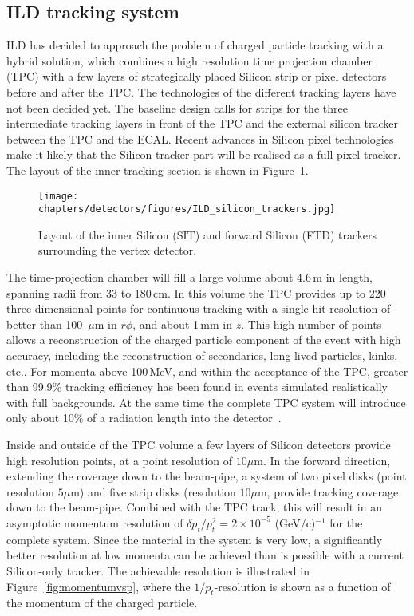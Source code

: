 \subsection{ILD tracking system}

 ILD has decided to approach the problem of charged particle tracking with a hybrid solution, which combines a high resolution time projection chamber (TPC) with a few layers of strategically placed Silicon strip or pixel detectors before and after the TPC. The technologies of the different tracking layers have not been decided yet. The baseline design calls for strips for the three intermediate tracking layers in front of the TPC and the external silicon tracker between the TPC and the ECAL. Recent advances in Silicon pixel technologies make it likely that the Silicon tracker part will be realised as a full pixel tracker. The layout of the inner tracking section is shown in Figure~\ref{fig:det:silicon}.
 \begin{figure}[t!]
\centering
\texttt{[image: chapters/detectors/figures/ILD\_silicon\_trackers.jpg]}
\caption{Layout of the inner Silicon (SIT) and forward Silicon (FTD) trackers surrounding the vertex detector.}
\label{fig:det:silicon}
\end{figure}

The time-projection chamber will fill a large volume about 4.6\,m in length, spanning radii from 33 to 180\,cm. In this volume the TPC provides up to 220 three dimensional points for continuous tracking with a single-hit resolution of better than 100~$\mu\mathrm{m}$ in $r \phi$, and about 1\,mm in $z$. This high number of points allows a reconstruction of the charged particle component of the event with high accuracy, including the reconstruction of secondaries, long lived particles, kinks, etc.. For momenta above 100\,MeV, and within the acceptance of the TPC, greater than 99.9\% tracking efficiency has been found in events simulated realistically with full backgrounds. At the same time the complete TPC system will introduce only about 10\% of a radiation length into the detector~\cite{Diener:2012mc}. 

Inside and outside of the TPC volume a few layers of Silicon detectors provide high resolution points, at a point resolution of $10\mu \mathrm{m}$. In the forward direction, extending the coverage down to the beam-pipe, a system of two pixel disks (point resolution $5 \mu$m) and five strip disks (resolution $10 \mu$m, provide tracking coverage down to the beam-pipe. Combined with the TPC track, this will result in an asymptotic momentum resolution of $\delta p_t / p_t^2 = 2 \times 10^{-5}$ (GeV/c)$^{-1}$ for the complete system. Since the material in the system is very low, a significantly better resolution at low momenta can be achieved than is possible with a current Silicon-only tracker. The achievable resolution is illustrated in Figure~\ref{fig:momentumvsp}, where the $1/p_t$-resolution is shown as a function of the momentum of the charged particle. 

